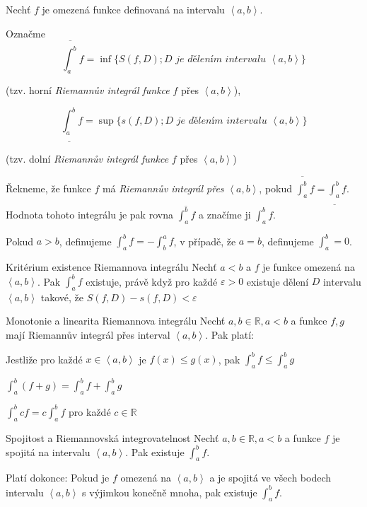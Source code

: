\begin{definice}
Nechť $f$ je omezená funkce definovaná na intervalu $\left<a,b\right>$.
\begin{penumerate}
\item
Označme
$$\overline{\int_a^b}f=\inf\{S(f,D); D \textit{ je dělením intervalu } \left<a,b\right>\}$$
\begin{center}(tzv. horní \emph{Riemannův integrál funkce} $f$ přes $\left<a,b\right>$),\end{center}

$$\underline{\int_a^b}f=\sup\{s(f,D); D \textit{ je dělením intervalu } \left<a,b\right>\}$$
\begin{center}(tzv. dolní \emph{Riemannův integrál funkce} $f$ přes $\left<a,b\right>$)\end{center}

\item Řekneme, že funkce $f$ má \emph{Riemannův integrál přes} $\left<a,b\right>$, pokud $\overline{\int_a^b}f=\underline{\int_a^b}f$. Hodnota tohoto integrálu je pak rovna $\overline{\int_a^bf}$ a značíme ji $\int_a^bf$. 

Pokud $a>b$, definujeme $\int_a^bf=-\int_b^af$, v případě, že $a=b$, definujeme $\int_a^b=0$.
\end{penumerate}
\end{definice}

\begin{vetaN}{Kritérium existence Riemannova integrálu}
Nechť $a<b$ a $f$ je funkce omezená na $\left<a,b\right>$. Pak $\int_a^bf$ existuje, právě když pro každé $\varepsilon > 0$ existuje dělení $D$ intervalu $\left<a,b\right>$ takové, že $S(f,D)-s(f,D)<\varepsilon$
\end{vetaN}

\begin{vetaN}{Monotonie a linearita Riemannova integrálu}
Nechť $a,b\in \mathbb{R}, a<b$ a funkce $f,g$ mají Riemannův integrál přes interval $\left<a,b\right>$. Pak platí:
\begin{penumerate}
	\item Jestliže pro každé $x \in \left<a,b\right>$ je $f(x) \le g(x)$, pak $\int_a^bf \le \int_a^bg$
	\item $\int_a^b(f+g) = \int_a^bf + \int_a^bg$
	\item $\int_a^bcf=c\int_a^bf$ pro každé $c \in \mathbb{R}$
\end{penumerate}
\end{vetaN}

\begin{vetaN}{Spojitost a Riemannovská integrovatelnost}
Nechť $a,b\in \mathbb{R}, a<b$ a funkce $f$ je spojitá na intervalu $\left<a,b\right>$. Pak existuje $\int_a^bf$.
\begin{poznamka}
Platí dokonce: Pokud je $f$ omezená na $\left<a,b\right>$ a je spojitá ve všech bodech intervalu $\left<a,b\right>$ s výjimkou konečně mnoha, pak existuje $\int_a^bf$.
\end{poznamka}
\end{vetaN}


